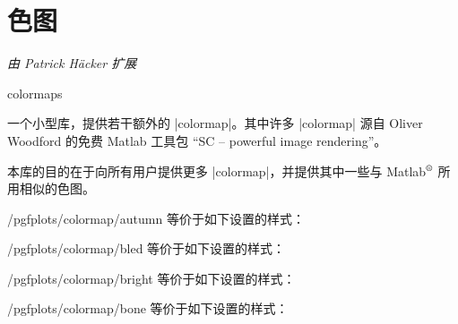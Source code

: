 
\section{色图}
\begingroup
\def\pgfplotsmanualcurlibrary{colormaps}

{\emph{由 Patrick Häcker 扩展}}


\begin{pgfplotslibrary}{colormaps}

一个小型库，提供若干额外的 |colormap|。其中许多 |colormap| 源自 Oliver Woodford
的免费 Matlab 工具包 ``SC -- powerful image rendering''。

本库的目的在于向所有用户提供更多 |colormap|，并提供其中一些与
Matlab$^\text{\textregistered}$ 所用相似的色图。

\begin{stylekey}{/pgfplots/colormap/autumn}
    等价于如下设置的样式：
\begin{codeexample}
\end{codeexample}
     \par \matlabcolormaptext
\end{stylekey}

\begin{stylekey}{/pgfplots/colormap/bled}
    等价于如下设置的样式：
\begin{codeexample}
\end{codeexample}
     \par \matlabcolormaptext
\end{stylekey}

\begin{stylekey}{/pgfplots/colormap/bright}
    等价于如下设置的样式：
\begin{codeexample}
\end{codeexample}
     \par \matlabcolormaptext
\end{stylekey}

\begin{stylekey}{/pgfplots/colormap/bone}
    等价于如下设置的样式：
\begin{codeexample}
\end{codeexample}
     \par \matlabcolormaptext
\end{stylekey}


\end{pgfplotslibrary}
